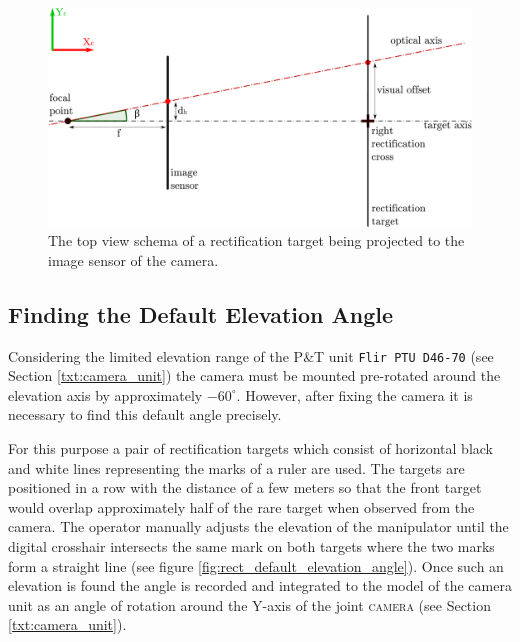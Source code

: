\begin{figure}[htb]
	\centering
	\includegraphics[width=0.65\linewidth]{fig/rect_pixel_offset.pdf}
	\caption{The top view schema of a rectification target being projected to the image sensor of the camera.}
	\label{fig:rect_pixel_offset}
\end{figure}


\subsection{Finding the Default Elevation Angle}

Considering the limited elevation range of the P\&T unit \texttt{Flir PTU D46-70} (see Section \ref{txt:camera_unit}) the camera must be mounted pre-rotated around the elevation axis by approximately $-60^{\circ}$. However, after fixing the camera it is necessary to find this default angle precisely. 

For this purpose a pair of rectification targets which consist of horizontal black and white lines representing the marks of a ruler are used. The targets are positioned in a row with the distance of a few meters so that the front target would overlap approximately half of the rare target when observed from the camera. The operator manually adjusts the elevation of the manipulator until the digital crosshair intersects the same mark on both targets where the two marks form a straight line (see figure \ref{fig:rect_default_elevation_angle}). Once such an elevation is found the angle is recorded and integrated to the model of the camera unit as an angle of rotation around the Y-axis of the joint \textsc{camera} (see Section \ref{txt:camera_unit}).

